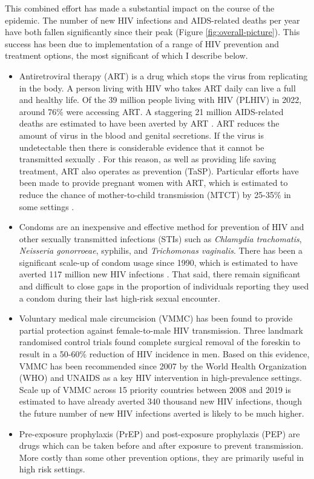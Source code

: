 \documentclass[a4paper, nobind]{templates/ociamthesis}
\providecommand{\tightlist}{%
  \setlength{\itemsep}{0pt}\setlength{\parskip}{0pt}}
\begin{document}
This combined effort has made a substantial impact on the course of the epidemic.
The number of new HIV infections and AIDS-related deaths per year have both fallen significantly since their peak (Figure \ref{fig:overall-picture}).
This success has been due to implementation of a range of HIV prevention and treatment options, the most significant of which I describe below.

\begin{itemize}
\tightlist
\item
  Antiretroviral therapy (ART) is a drug which stops the virus from replicating in the body.
  A person living with HIV who takes ART daily can live a full and healthy life.
  Of the 39 million people living with HIV (PLHIV) in 2022, around 76\% were accessing ART.
  A staggering 21 million AIDS-related deaths are estimated to have been averted by ART \autocite{unaids2023global}.
  ART reduces the amount of virus in the blood and genital secretions.
  If the virus is undetectable then there is considerable evidence that it cannot be transmitted sexually \autocite{cohen2011prevention}.
  For this reason, as well as providing life saving treatment, ART also operates as prevention (TaSP).
  Particular efforts have been made to provide pregnant women with ART, which is estimated to reduce the chance of mother-to-child transmission (MTCT) by 25-35\% in some settings \autocite{siegfried2011antiretrovirals}.
\item
  Condoms are an inexpensive and effective method for prevention of HIV and other sexually transmitted infections (STIs) such as \emph{Chlamydia trachomatis}, \emph{Neisseria gonorroeae}, syphilis, and \emph{Trichomonas vaginalis}.
  There has been a significant scale-up of condom usage since 1990, which is estimated to have averted 117 million new HIV infections \autocite{stover2021impact}.
  That said, there remain significant and difficult to close gaps in the proportion of individuals reporting they used a condom during their last high-risk sexual encounter.
\item
  Voluntary medical male circumcision (VMMC) has been found to provide partial protection against female-to-male HIV transmission.
  Three landmark randomised control trials \autocite{auvert2005randomized,gray2007male,bailey2007male} found complete surgical removal of the foreskin to result in a 50-60\% reduction of HIV incidence in men.
  Based on this evidence, VMMC has been recommended since 2007 by the World Health Organization (WHO) and UNAIDS as a key HIV intervention in high-prevalence settings.
  Scale up of VMMC across 15 priority countries between 2008 and 2019 is estimated to have already averted 340 thousand new HIV infections, though the future number of new HIV infections averted is likely to be much higher.
\item
  Pre-exposure prophylaxis (PrEP) and post-exposure prophylaxis (PEP) are drugs which can be taken before and after exposure to prevent transmission.
  More costly than some other prevention options, they are primarily useful in high risk settings.
\end{itemize}
\end{document}
